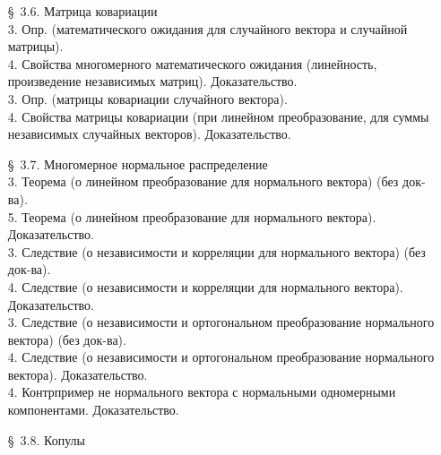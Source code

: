 \documentclass[10pt]{amsart}
\begin{document}
\begin{enumerate}
\begin{enumerate}
\item[\S\, 3.6.] Матрица ковариации \\
3. Опр. (математического ожидания для случайного вектора и случайной матрицы). \\
4. Свойства многомерного математического ожидания (линейность, произведение независимых матриц). Доказательство. \\ 
3. Опр. (матрицы ковариации случайного вектора). \\
4. Свойства матрицы ковариации (при линейном преобразование, для суммы независимых случайных векторов). Доказательство. \\


\item[\S\, 3.7.] Многомерное нормальное распределение \\

3. Теорема (о линейном преобразование для нормального вектора) (без док-ва). \\
5. Теорема (о линейном преобразование для нормального вектора). Доказательство. \\
3. Следствие (о независимости и корреляции для нормального вектора) (без док-ва). \\ 
4. Следствие (о независимости и корреляции для нормального вектора). Доказательство. \\ 
3. Следствие (о независимости и  ортогональном преобразование нормального вектора) (без док-ва). \\ 
4. Следствие (о независимости и  ортогональном преобразование нормального вектора). Доказательство. \\ 
4. Контрпример не нормального вектора с нормальными одномерными компонентами. Доказательство. \\ 

\item[\S\, 3.8.] Копулы \\
        

\end{enumerate}
\end{enumerate}
\end{document}
